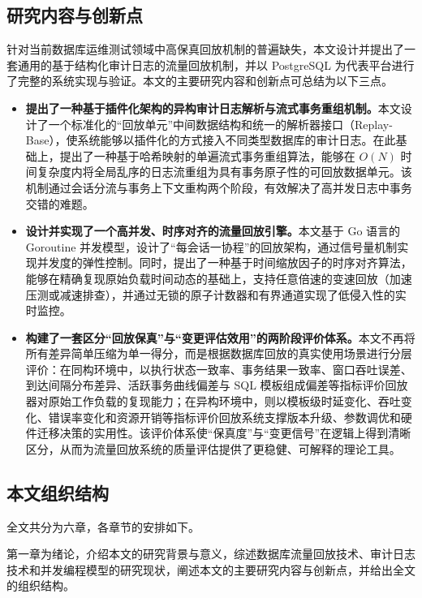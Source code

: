 \subsection{研究内容与创新点}

针对当前数据库运维测试领域中高保真回放机制的普遍缺失，本文设计并提出了一套通用的基于结构化审计日志的流量回放机制，并以 PostgreSQL 为代表平台进行了完整的系统实现与验证。本文的主要研究内容和创新点可总结为以下三点。
\begin{itemize}
\item[(1)] \textbf{提出了一种基于插件化架构的异构审计日志解析与流式事务重组机制。}本文设计了一个标准化的“回放单元”中间数据结构和统一的解析器接口（Replay-Base），使系统能够以插件化的方式接入不同类型数据库的审计日志。在此基础上，提出了一种基于哈希映射的单遍流式事务重组算法，能够在 $O(N)$ 时间复杂度内将全局乱序的日志流重组为具有事务原子性的可回放数据单元。该机制通过会话分流与事务上下文重构两个阶段，有效解决了高并发日志中事务交错的难题。

\item[(2)] \textbf{设计并实现了一个高并发、时序对齐的流量回放引擎。}本文基于 Go 语言的 Goroutine 并发模型，设计了“每会话一协程”的回放架构，通过信号量机制实现并发度的弹性控制。同时，提出了一种基于时间缩放因子的时序对齐算法，能够在精确复现原始负载时间动态的基础上，支持任意倍速的变速回放（加速压测或减速排查），并通过无锁的原子计数器和有界通道实现了低侵入性的实时监控。

\item[(3)] \textbf{构建了一套区分“回放保真”与“变更评估效用”的两阶段评价体系。}本文不再将所有差异简单压缩为单一得分，而是根据数据库回放的真实使用场景进行分层评价：在同构环境中，以执行状态一致率、事务结果一致率、窗口吞吐误差、到达间隔分布差异、活跃事务曲线偏差与 SQL 模板组成偏差等指标评价回放器对原始工作负载的复现能力；在异构环境中，则以模板级时延变化、吞吐变化、错误率变化和资源开销等指标评价回放系统支撑版本升级、参数调优和硬件迁移决策的实用性。该评价体系使“保真度”与“变更信号”在逻辑上得到清晰区分，从而为流量回放系统的质量评估提供了更稳健、可解释的理论工具。

\end{itemize}



\subsection{本文组织结构}

全文共分为六章，各章节的安排如下。

第一章为绪论，介绍本文的研究背景与意义，综述数据库流量回放技术、审计日志技术和并发编程模型的研究现状，阐述本文的主要研究内容与创新点，并给出全文的组织结构。

